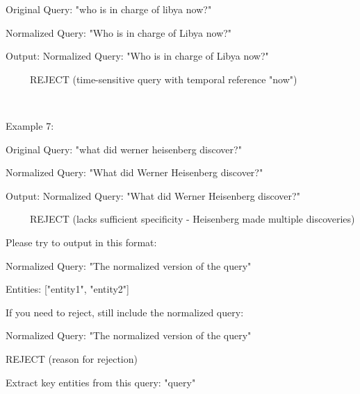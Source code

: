 \begin{tcolorbox}[breakable,title=Prompt Used by the GPT-4o for Data Filtering]
Original Query: "who is in charge of libya now?"



Normalized Query: "Who is in charge of Libya now?"



Output: Normalized Query: "Who is in charge of Libya now?"



      REJECT (time-sensitive query with temporal reference "now")

      



Example 7:



Original Query: "what did werner heisenberg discover?"



Normalized Query: "What did Werner Heisenberg discover?"



Output: Normalized Query: "What did Werner Heisenberg discover?"



      REJECT (lacks sufficient specificity - Heisenberg made multiple discoveries)



Please try to output in this format:



Normalized Query: "The normalized version of the query"



Entities: ["entity1", "entity2"]



If you need to reject, still include the normalized query:



Normalized Query: "The normalized version of the query"



REJECT (reason for rejection)



Extract key entities from this query: "{query}"



\end{tcolorbox}















